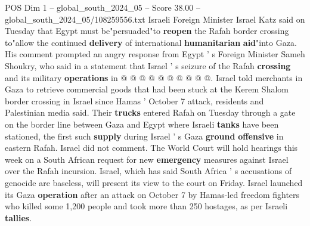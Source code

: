 \begin{textsample}{POS Dim 1 – global\_south\_2024\_05 – Score 38.00 – global\_south\_2024\_05/108259556.txt}
Israeli Foreign Minister Israel Katz said on Tuesday that Egypt must be"persuaded"to \textbf{reopen} the Rafah border crossing to"allow the continued \textbf{delivery} of international \textbf{humanitarian} \textbf{aid}"into Gaza.
His comment prompted an angry response from Egypt ' s Foreign Minister Sameh Shoukry, who said in a statement that Israel ' s seizure of the Rafah \textbf{crossing} and its military \textbf{operations} in @ @ @ @ @ @ @ @ @ @.
Israel told merchants in Gaza to retrieve commercial goods that had been stuck at the Kerem Shalom border crossing in Israel since Hamas ' October 7 attack, residents and Palestinian media said.
Their \textbf{trucks} entered Rafah on Tuesday through a gate on the border line between Gaza and Egypt where Israeli \textbf{tanks} have been stationed, the first such \textbf{supply} during Israel ' s Gaza \textbf{ground} \textbf{offensive} in eastern Rafah.
Israel did not comment.
The World Court will hold hearings this week on a South African request for new \textbf{emergency} measures against Israel over the Rafah incursion.
Israel, which has said South Africa ' s accusations of genocide are baseless, will present its view to the court on Friday.
Israel launched its Gaza \textbf{operation} after an attack on October 7 by Hamas-led freedom fighters who killed some 1,200 people and took more than 250 hostages, as per Israeli \textbf{tallies}.

\end{textsample}
